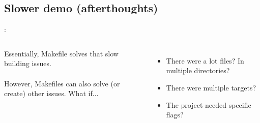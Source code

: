 \subsection{Slower demo (afterthoughts)}
\begin{frame}{\secname: \small\subsecname\normalsize}
    \begin{columns}

        Essentially, Makefile solves that slow building issues. \\~\\

        However, Makefiles can also solve (or create) other issues.
        What if... \\~\\ \pause

        \begin{itemize}
            \item There were a lot files? In multiple directories? \pause
            \item There were multiple targets? \pause
            \item The project needed specific flags? \pause
        \end{itemize}

    \end{columns}
\end{frame}
